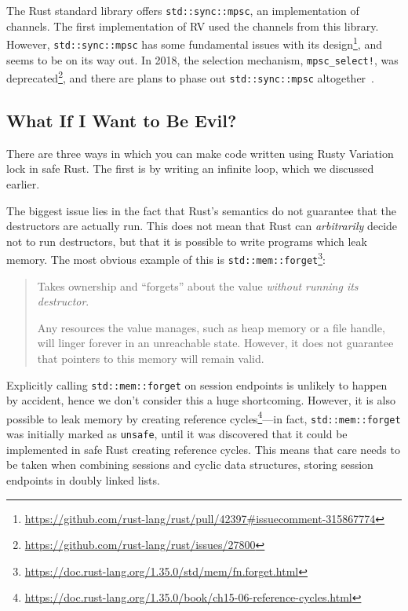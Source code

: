 \documentclass[copyright,creativecommons]{eptcs}
\begin{document}
The Rust standard library offers \lstinline{std::sync::mpsc}, an implementation of channels. The first implementation of RV used the channels from this library. However, \lstinline{std::sync::mpsc} has some fundamental issues with its design\footnote{\url{https://github.com/rust-lang/rust/pull/42397\#issuecomment-315867774}}, and seems to be on its way out. In 2018, the selection mechanism, \lstinline{mpsc_select!}, was deprecated\footnote{\url{https://github.com/rust-lang/rust/issues/27800}}, and there are plans to phase out \lstinline{std::sync::mpsc} altogether~\cite{glavina2019}.


\subsection{What If I Want to Be Evil?}\label{sec:limitations}
There are three ways in which you can make code written using Rusty Variation lock in safe Rust. The first is by writing an infinite loop, which we discussed earlier. 

The biggest issue lies in the fact that Rust's semantics do not guarantee that the destructors are actually run. This does not mean that Rust can \emph{arbitrarily} decide not to run destructors, but that it is possible to write programs which leak memory. The most obvious example of this is \lstinline{std::mem::forget}\footnote{\url{https://doc.rust-lang.org/1.35.0/std/mem/fn.forget.html}}:
\begin{quotation}
  \noindent
  Takes ownership and ``forgets'' about the value \emph{without running its destructor}.  

  \noindent
  Any resources the value manages, such as heap memory or a file handle, will linger forever in an unreachable state. However, it does not guarantee that pointers to this memory will remain valid.
\end{quotation}
Explicitly calling \lstinline{std::mem::forget} on session endpoints is unlikely to happen by accident, hence we don't consider this a huge shortcoming. However, it is also possible to leak memory by creating reference cycles\footnote{\url{https://doc.rust-lang.org/1.35.0/book/ch15-06-reference-cycles.html}}---in fact, \lstinline{std::mem::forget} was initially marked as \lstinline{unsafe}, until it was discovered that it could be implemented in safe Rust creating reference cycles. This means that care needs to be taken when combining sessions and cyclic data structures, \eg storing session endpoints in doubly linked lists.
\end{document}
